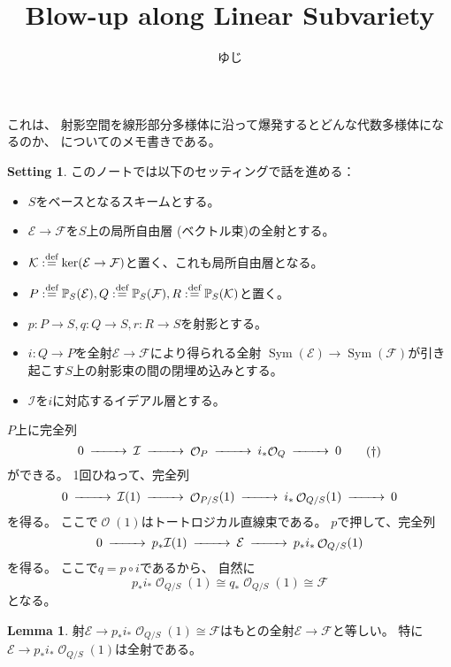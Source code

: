 \documentclass[uplatex]{jsarticle}
\title{Blow-up along Linear Subvariety}
\author{ゆじ}
\theoremstyle{definition}
\newtheorem{lem}[lem]{Lemma}
\newtheorem*{setting*}{Setting}
\DeclareMathOperator{\Sym}{\mathrm{Sym}}
\renewcommand{\P}{\mathbb{P}}
\newcommand{\mcE}{\mathcal{E}}
\newcommand{\mcF}{\mathcal{F}}
\newcommand{\mcI}{\mathcal{I}}
\newcommand{\mcK}{\mathcal{K}}
\newcommand{\mcO}{\mathcal{O}}
\DeclareMathOperator{\OOO}{\mcO}
\newcommand{\OP}{{\OOO_P}}
\newcommand{\OQ}{{\OOO_Q}}
\newcommand{\OO}[1]{\OOO_{#1}}
\def\dfn{:\overset{\mbox{{\scriptsize def}}}{=}}
\begin{document}
\maketitle

これは、
射影空間を線形部分多様体に沿って爆発するとどんな代数多様体になるのか、
についてのメモ書きである。



\begin{setting*}
  このノートでは以下のセッティングで話を進める：
  \begin{itemize}
    \item
    \(S\)をベースとなるスキームとする。
    \item
    \(\mcE\to \mcF\)を\(S\)上の局所自由層 (ベクトル束)の全射とする。
    \item
    \(\mcK\dfn \ker (\mcE\to \mcF)\)と置く、これも局所自由層となる。
    \item
    \(P\dfn \P_S(\mcE), Q\dfn\P_S(\mcF), R\dfn \P_S(\mcK)\)と置く。
    \item
    \(p:P\to S, q:Q\to S, r:R\to S\)を射影とする。
    \item
    \(i:Q\to P\)を全射\(\mcE\to \mcF\)により得られる全射
    \(\Sym(\mcE)\to \Sym(\mcF)\)が引き起こす\(S\)上の射影束の間の閉埋め込みとする。
    \item
    \(\mcI\)を\(i\)に対応するイデアル層とする。
  \end{itemize}
\end{setting*}


\(P\)上に完全列
\begin{equation}\label{eq: exact ideal of Q on P}
  \begin{CD}
    0 @>>> \mcI @>>> \OP @>>> i_*\OQ @>>> 0
  \end{CD}
  \tag{\(\dagger\)}
\end{equation}
ができる。
1回ひねって、完全列
\[
\begin{CD}
  0 @>>> \mcI(1) @>>> \OO{P/S}(1) @>>> i_*\OO{Q/S}(1) @>>> 0
\end{CD}
\]
を得る。
ここで\(\OOO(1)\)はトートロジカル直線束である。
\(p\)で押して、完全列
\[
\begin{CD}
  0 @>>> p_*\mcI(1) @>>> \mcE @>>> p_*i_*\OO{Q/S}(1)
\end{CD}
\]
を得る。
ここで\(q=p\circ i\)であるから、
自然に
\[p_*i_*\OO{Q/S}(1) \cong q_*\OO{Q/S}(1) \cong \mcF\]
となる。

\begin{lem}
  射\(\mcE\to p_*i_*\OO{Q/S}(1)\cong \mcF\)はもとの全射\(\mcE\to \mcF\)と等しい。
  特に\(\mcE\to p_*i_*\OO{Q/S}(1)\)は全射である。
\end{lem}
\end{document}
